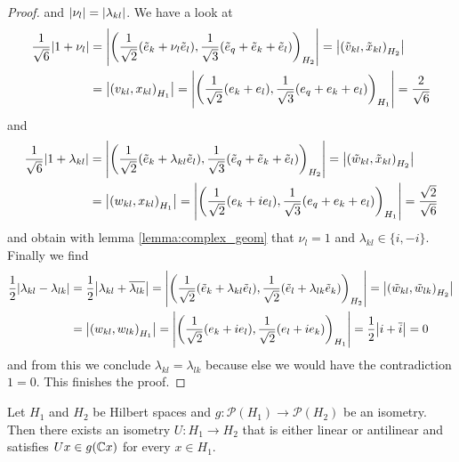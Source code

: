 \begin{proof}
	and ${\left | \nu_l \right |} = {\left | \lambda_{kl} \right |}$. We have a look at 
	\begin{align*}
		\frac{1}{\sqrt{6}}{\left | 1 + \nu_l \right |} &= {\left | {\left ( \frac{1}{\sqrt{2}}(\tilde{e}_k + \nu_l \tilde{e}_l), \frac{1}{\sqrt{3}}(\tilde{e}_q + \tilde{e}_k + \tilde{e}_l) \right )}_{H_2} \right |} = {\left | {\left ( \tilde{v}_{kl}, \tilde{x}_{kl} \right )}_{H_2} \right |} \\
		&= {\left | {\left ( v_{kl}, x_{kl} \right )}_{H_1} \right |} = {\left | {\left ( \frac{1}{\sqrt{2}}(e_k + e_l), \frac{1}{\sqrt{3}}(e_q + e_k + e_l) \right )}_{H_1} \right |} = \frac{2}{\sqrt{6}}
	\end{align*}
	and 
	\begin{align*}
		\frac{1}{\sqrt{6}}{\left | 1 + \lambda_{kl} \right |} &= {\left | {\left ( \frac{1}{\sqrt{2}}(\tilde{e}_k + \lambda_{kl} \tilde{e}_l), \frac{1}{\sqrt{3}}(\tilde{e}_q + \tilde{e}_k + \tilde{e}_l) \right )}_{H_2} \right |} = {\left | {\left ( \tilde{w}_{kl}, \tilde{x}_{kl} \right )}_{H_2} \right |} \\
		&= {\left | {\left ( w_{kl}, x_{kl} \right )}_{H_1} \right |} = {\left | {\left ( \frac{1}{\sqrt{2}}(e_k + i e_l), \frac{1}{\sqrt{3}}(e_q + e_k + e_l) \right )}_{H_1} \right |} = \frac{\sqrt{2}}{\sqrt{6}}
	\end{align*}
	and obtain with lemma \ref{lemma:complex_geom} that $\nu_l = 1$ and $\lambda_{kl} \in \{i, -i\}$. Finally we find
	\begin{align*}
		\frac{1}{2}{\left | \lambda_{kl} - \lambda_{lk} \right |} &= \frac{1}{2}{\left | \lambda_{kl} + \overline{\lambda_{lk}} \right |} = {\left | {\left ( \frac{1}{\sqrt{2}}(\tilde{e}_k + \lambda_{kl} \tilde{e}_l), \frac{1}{\sqrt{2}}(\tilde{e}_l + \lambda_{lk} \tilde{e}_k) \right )}_{H_2} \right |} = {\left | {\left ( \tilde{w}_{kl}, \tilde{w}_{lk} \right )}_{H_2} \right |} \\
		&= {\left | {\left ( w_{kl}, w_{lk} \right )}_{H_1} \right |} = {\left | {\left ( \frac{1}{\sqrt{2}}(e_k + i e_l), \frac{1}{\sqrt{2}}(e_l + i e_k) \right )}_{H_1} \right |} = \frac{1}{2} {\left | i + \overline{i} \right |} = 0
	\end{align*}
	and from this we conclude $\lambda_{kl} = \lambda_{lk}$ because else we would have the contradiction $1 = 0$. This finishes the proof.
\end{proof}


\begin{theorem} \label{theorem:wigner}
	Let $H_1$ and $H_2$ be Hilbert spaces and $g: \mathcal{P}(H_1) \to \mathcal{P}(H_2)$ be an isometry. Then there exists an isometry $U: H_1 \to H_2$ that is either linear or antilinear and satisfies $Ux \in g(\mathbb{C} x)$ for every $x \in H_1$. 
\end{theorem}

